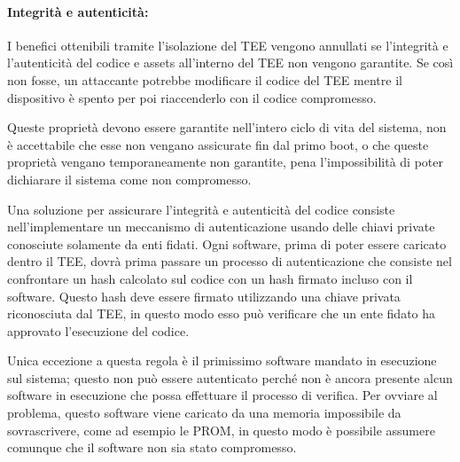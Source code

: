 \documentclass[12pt,italian]{report}
\begin{document}
\paragraph{Integrità e autenticità:}
I benefici ottenibili tramite l'isolazione del TEE vengono annullati se
l'integrità e l'autenticità del codice e assets all'interno del TEE non
vengono garantite. Se così non fosse, un attaccante potrebbe modificare
il codice del TEE mentre il dispositivo è spento per poi riaccenderlo con
il codice compromesso.

Queste proprietà devono essere garantite nell'intero ciclo di vita del
sistema, non è accettabile che esse non vengano assicurate fin dal primo boot,
o che queste proprietà vengano temporaneamente non garantite, pena
l'impossibilità di poter dichiarare il sistema come non compromesso.

Una soluzione per assicurare l'integrità e autenticità del codice consiste
nell'implementare un meccanismo di autenticazione usando delle chiavi
private conosciute solamente da enti fidati.
Ogni software, prima di poter essere caricato dentro il TEE, dovrà prima
passare un processo di autenticazione che consiste nel confrontare un hash
calcolato sul codice con un hash firmato incluso con il software.
Questo hash deve essere firmato utilizzando una chiave privata riconosciuta
dal TEE, in questo modo esso può verificare che un ente fidato ha approvato
l'esecuzione del codice.

Unica eccezione a questa regola è il primissimo software mandato in esecuzione
sul sistema; questo non può essere autenticato perché non è ancora presente
alcun software in esecuzione che possa effettuare il processo di verifica.
Per ovviare al problema, questo software viene caricato da una memoria
impossibile da sovrascrivere, come ad esempio le PROM, in questo modo è
possibile assumere comunque che il software non sia stato compromesso.
\end{document}
